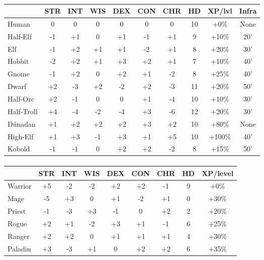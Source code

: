 \paragraph{}
\begin{tabular}{|l|c|c|c|c|c|c|c|c|c|}
\hline
       & STR & INT & WIS & DEX & CON & CHR & HD & XP/lvl &
       Infra\\
\hline
Human      & 0  & 0  & 0  & 0  & 0  & 0  & 10 & +0\%   & None\\
Half-Elf   & -1 & +1 & 0  & +1 & -1 & +1 & 9  & +10\%  & 20'\\
Elf        & -1 & +2 & +1 & +1 & -2 & +1 & 8  & +20\%  & 30'\\
Hobbit     & -2 & +2 & +1 & +3 & +2 & +1 & 7  & +10\%  & 40'\\
Gnome      & -1 & +2 & 0  & +2 & +1 & -2 & 8  & +25\%  & 40'\\
Dwarf      & +2 & -3 & +2 & -2 & +2 & -3 & 11 & +20\%  & 50'\\
Half-Orc   & +2 & -1 & 0  & 0  & +1 & -4 & 10 & +10\%  & 30'\\
Half-Troll & +4 & -4 & -2 & -4 & +3 & -6 & 12 & +20\%  & 30'\\
D\'{u}nadan& +1 & +2 & +2 & +2 & +3 & +2 & 10 & +80\%  & None\\
High-Elf   & +1 & +3 & -1 & +3 & +1 & +5 & 10 & +100\% & 40'\\
Kobold     & -1 & -1 & 0  & +2 & +2 & -2 & 8  & +15\%  & 50'\\
\hline
\end{tabular}

\paragraph{}
\begin{tabular}{|l|c|c|c|c|c|c|c|c|}
\hline
   & STR & INT & WIS & DEX & CON & CHR & HD & XP/level \\
\hline
Warrior & +5 & -2 & -2 & +2 & +2 & -1 & 9 & +0\%\\
Mage    & -5 & +3 & 0  & +1 & -2 & +1 & 0 & +30\%\\
Priest  & -1 & -3 & +3 & -1 & 0  & +2 & 2 & +20\%\\
Rogue   & +2 & +1 & -2 & +3 & +1 & -1 & 6 & +25\%\\
Ranger  & +2 & +2 & 0  & +1 & +1 & +1 & 4 & +30\%\\
Paladin & +3 & -3 & +1 & 0  & +2 & +2 & 6 & +35\%\\
\hline
\end{tabular}

